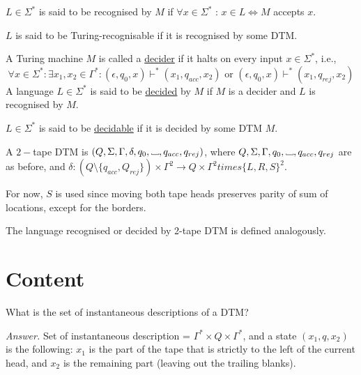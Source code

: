 \documentclass[a4paper]{article}
\newenvironment{ans}{\begin{breakbox}\textit{Answer.}}{\end{breakbox}}
\newcommand{\changesto}{\vdash}
\newcommand\Vtextvisiblespace[1][.3em]{%
    \mbox{\kern.06em\vrule height.3ex}%
    \vbox{\hrule width#1}%
    \hbox{\vrule height.3ex}
}
\newcommand{\blank}{{\Vtextvisiblespace[0.7em]}}
\begin{document}
\begin{defn}
    $L \in \Sigma^*$ is said to be recognised by $M$ if $\forall x \in \Sigma^*$ : $x \in L \iff M$ accepts $x$.
\end{defn}

    \begin{defn}
        $L$ is said to be Turing-recognisable if it is recognised by some DTM.
    \end{defn}

    \begin{defn}
        A Turing machine $M$ is called a \underline{decider} if it halts on every input $x \in \Sigma^*$, i.e.,
        \[
            \forall x \in \Sigma^* : \exists x_1, x_2 \in \Gamma^* : (\epsilon, q_0, x) \changesto^* (x_1, q_{acc}, x_2) \text{ or } (\epsilon, q_0, x) \changesto^* (x_1, q_{rej}, x_2)
        \]
        A language $L \in \Sigma^*$ is said to be \underline{decided}  by $M$ if $M$ is a decider and $L$ is recognised by $M$.
    \end{defn}

    \begin{defn}
        $L \in \Sigma^*$ is said to be \underline{decidable} if it is decided by some DTM $M$.
    \end{defn}

    \begin{defn}
        A $2-$tape DTM is $(Q, \Sigma, \Gamma, \delta, q_0, \blank, q_{acc}, q_{rej})$, where $Q, \Sigma, \Gamma, q_0, \blank, q_{acc}, q_{rej}$ are as before, and $\delta : (Q \setminus
        \{q_{acc}, Q_{rej}\}) \times \Gamma^2 \to Q \times \Gamma^2 times \{L, R, S\}^2$.
    \end{defn}
    For now, $S$ is used since moving both tape heads preserves parity of sum of locations, except for the borders.

    The language recognised or decided by 2-tape DTM is defined analogously.

    \section{Content}

    \begin{ques}
        What is the set of instantaneous descriptions of a DTM?
    \end{ques}

    \begin{ans}
        Set of instantaneous description = $\Gamma^* \times Q \times \Gamma^*$, and a state $(x_1, q, x_2)$ is the following:
        $x_1$ is the part of the tape that is strictly to the left of the current head, and $x_2$ is the remaining part (leaving out the trailing blanks).
    \end{ans}
\end{document}
